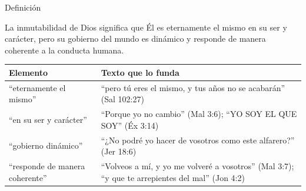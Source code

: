 \begin{frame}{Definición}
\begin{tcolorbox}[colback=papiro,colframe=azul,boxrule=1pt,arc=3pt,title={\small Definición teológica bíblica},colbacktitle=azul,coltitle=papiro]
\small La inmutabilidad de Dios significa que Él es eternamente el mismo en su ser y carácter, pero su gobierno del mundo es dinámico y responde de manera coherente a la conducta humana.
\end{tcolorbox}
\scriptsize\renewcommand{\arraystretch}{1.18}
\begin{tabular}{@{}>{\RaggedRight\arraybackslash}p{3.0cm}>{\RaggedRight\arraybackslash}p{8.8cm}@{}}
\toprule
\textbf{Elemento} & \textbf{Texto que lo funda} \\ \midrule
``eternamente el mismo'' & ``pero tú eres el mismo, y tus años no se acabarán'' (Sal 102:27) \\
``en su ser y carácter'' & ``Porque yo \SENOR{} no cambio'' (Mal 3:6); ``YO SOY EL QUE SOY'' (Éx 3:14) \\
``gobierno dinámico'' & ``¿No podré yo hacer de vosotros como este alfarero?'' (Jer 18:6) \\
``responde de manera coherente'' & ``Volveos a mí, y yo me volveré a vosotros'' (Mal 3:7); ``y que te arrepientes del mal'' (Jon 4:2) \\
\bottomrule
\end{tabular}
\end{frame}

